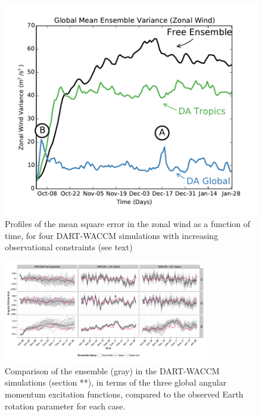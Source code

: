  \begin{figure}
	 \includegraphics[width=\textwidth]{Paper_figures/ERPDA_paper_evalvariable_state_space.pdf}
	 \caption{Profiles of the mean square error in the zonal wind as a function of time, for four DART-WACCM simulations with increasing observational constraints (see text)}
	 \label{fig:evalvariable_state}
\end{figure}



\begin{figure}
	 \includegraphics[width=0.8\textwidth]{Paper_figures/ERPDA_paper_evalvariable_aam_space.pdf}
	 \caption{Comparison of the ensemble (gray) in the DART-WACCM simulations (section **), in terms of the three global angular momentum excitation functions, compared to the observed Earth rotation parameter for each case.}
	 \label{fig:evalvariable_aam}
\end{figure}





